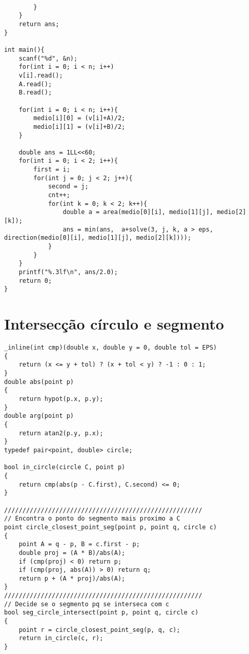 \begin{multicols}{2}
\begin{lstlisting}
			
		}
	}
	return ans;
}

int main(){
	scanf("%d", &n);
	for(int i = 0; i < n; i++)
	v[i].read();
	A.read();
	B.read();
	
	for(int i = 0; i < n; i++){
		medio[i][0] = (v[i]+A)/2;
		medio[i][1] = (v[i]+B)/2;			
	}
	
	double ans = 1LL<<60;
	for(int i = 0; i < 2; i++){
		first = i;
		for(int j = 0; j < 2; j++){
			second = j;
			cnt++;
			for(int k = 0; k < 2; k++){
				double a = area(medio[0][i], medio[1][j], medio[2][k]);
				ans = min(ans,  a+solve(3, j, k, a > eps, direction(medio[0][i], medio[1][j], medio[2][k])));
			}
		}
	}
	printf("%.3lf\n", ans/2.0);
	return 0;
}
	\end{lstlisting}
\end{multicols}

\section{Intersecção círculo e segmento}


\begin{multicols}{2}
	\begin{lstlisting}
_inline(int cmp)(double x, double y = 0, double tol = EPS)
{
	return (x <= y + tol) ? (x + tol < y) ? -1 : 0 : 1;
}
double abs(point p)
{
	return hypot(p.x, p.y);
}
double arg(point p)
{
	return atan2(p.y, p.x);
}
typedef pair<point, double> circle;

bool in_circle(circle C, point p)
{
	return cmp(abs(p - C.first), C.second) <= 0;
}

//////////////////////////////////////////////////////
// Encontra o ponto do segmento mais proximo a C
point circle_closest_point_seg(point p, point q, circle c)
{
	point A = q - p, B = c.first - p;
	double proj = (A * B)/abs(A);
	if (cmp(proj) < 0) return p;
	if (cmp(proj, abs(A)) > 0) return q;
	return p + (A * proj)/abs(A);
}
//////////////////////////////////////////////////////
// Decide se o segmento pq se interseca com c
bool seg_circle_intersect(point p, point q, circle c)
{
	point r = circle_closest_point_seg(p, q, c);
	return in_circle(c, r);
}
	\end{lstlisting}
\end{multicols}

